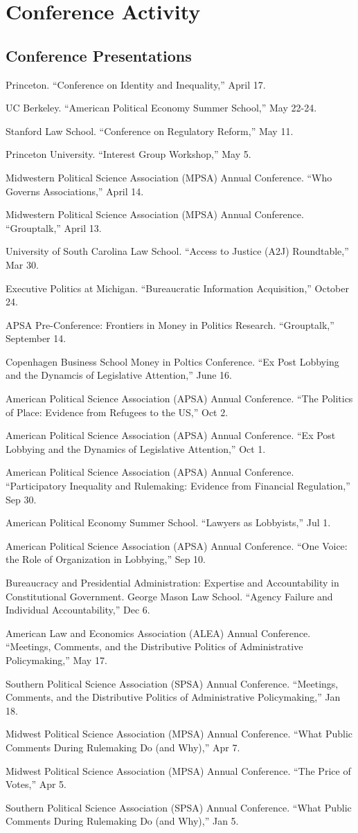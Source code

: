 \documentclass[12pt,letterpaper]{report}
\newcommand{\talk}[4]{\item[#1]{\tab{}#3. \enquote{#2,} #4.}} %
\newcommand{\APSA}{American Political Science Association (APSA) Annual Conference}
\newcommand{\MPSA}{Midwestern Political Science Association (MPSA) Annual Conference}
\begin{document}
    \section*{Conference Activity}
    
    \subsection*{Conference Presentations}
    \begin{tablist}
    \talk{2026}{Conference on Identity and Inequality}{Princeton}{April 17}
    \talk{2024}{American Political Economy Summer School}{UC Berkeley}{May 22-24}
    \talk{2023}{Conference on Regulatory Reform}{Stanford Law School}{May 11}
    \talk{2023}{Interest Group Workshop}{Princeton University}{May 5}
	\talk{2023}{Who Governs Associations}{\MPSA}{April 14}
	\talk{2023}{Grouptalk}{\MPSA}{April 13} 
    \talk{2023}{Access to Justice (A2J) Roundtable}{University of South Carolina Law School}{Mar 30}
	\talk{2022}{Bureaucratic Information Acquisition}{Executive Politics at Michigan}{October 24}
	\talk{2022}{Grouptalk}{APSA Pre-Conference: Frontiers in Money in Politics Research}{September 14}
    \talk{2022}{Ex Post Lobbying and the Dynamcis of Legislative Attention}{Copenhagen Business School Money in Poltics Conference}{June 16}
    \talk{2021}{The Politics of Place: Evidence from Refugees to the US}{\APSA}{Oct 2}
    \talk{2021}{Ex Post Lobbying and the Dynamics of Legislative Attention}{\APSA}{Oct 1}
    \talk{2021}{Participatory Inequality and Rulemaking: Evidence from Financial Regulation}{\APSA}{Sep 30}
    \talk{2021}{Lawyers as Lobbyists}{American Political Economy Summer School}{Jul 1}
    \talk{2020}{One Voice: the Role of Organization in Lobbying}{\APSA}{Sep 10}
    \talk{2019}{Agency Failure and Individual Accountability}{Bureaucracy and Presidential Administration: Expertise and Accountability in Constitutional Government. George Mason Law School}{Dec 6}
    \talk{2019}{Meetings, Comments, and the Distributive Politics of Administrative Policymaking}{American Law and Economics Association (ALEA) Annual Conference}{May 17}
    \talk{2019}{Meetings, Comments, and the Distributive Politics of Administrative Policymaking}{Southern Political Science Association (SPSA) Annual Conference}{Jan 18} 
    \talk{2018}{What Public Comments During Rulemaking Do (and Why)}{Midwest Political Science Association (MPSA) Annual Conference}{Apr 7}
    \talk{2018}{The Price of Votes}{Midwest Political Science Association (MPSA) Annual Conference}{Apr 5}
    \talk{2018}{What Public Comments During Rulemaking Do (and Why)}{Southern Political Science Association (SPSA) Annual Conference}{Jan 5} 

\end{tablist}
\end{document}
